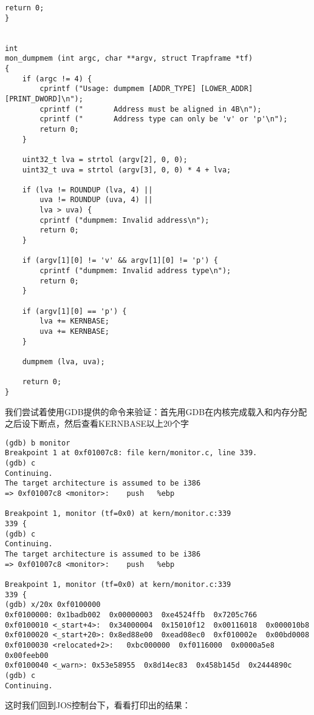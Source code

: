 \documentclass{article}
\begin{document}
\begin{CJK*}{UTF8}{gkai}
\begin{enumerate}
{\begin{lstlisting}[style=ccode, title={\scriptsize \ttfamily \bfseries kern/pmap.c}]
    return 0;
}


int
mon_dumpmem (int argc, char **argv, struct Trapframe *tf)
{
    if (argc != 4) {
        cprintf ("Usage: dumpmem [ADDR_TYPE] [LOWER_ADDR] [PRINT_DWORD]\n");
        cprintf ("       Address must be aligned in 4B\n");
        cprintf ("       Address type can only be 'v' or 'p'\n");
        return 0;
    }

    uint32_t lva = strtol (argv[2], 0, 0);
    uint32_t uva = strtol (argv[3], 0, 0) * 4 + lva;

    if (lva != ROUNDUP (lva, 4) ||
        uva != ROUNDUP (uva, 4) ||
        lva > uva) {
        cprintf ("dumpmem: Invalid address\n");
        return 0;
    }

    if (argv[1][0] != 'v' && argv[1][0] != 'p') {
        cprintf ("dumpmem: Invalid address type\n");
        return 0;
    }

    if (argv[1][0] == 'p') {
        lva += KERNBASE;
        uva += KERNBASE;
    }

    dumpmem (lva, uva); 

    return 0;
}

\end{lstlisting}

我们尝试着使用GDB提供的命令来验证：首先用GDB在内核完成载入和内存分配之后设下断点，然后查看KERNBASE以上20个字

\begin{lstlisting}[style=console]
(gdb) b monitor
Breakpoint 1 at 0xf01007c8: file kern/monitor.c, line 339.
(gdb) c
Continuing.
The target architecture is assumed to be i386
=> 0xf01007c8 <monitor>:	push   %ebp

Breakpoint 1, monitor (tf=0x0) at kern/monitor.c:339
339	{
(gdb) c
Continuing.
The target architecture is assumed to be i386
=> 0xf01007c8 <monitor>:	push   %ebp

Breakpoint 1, monitor (tf=0x0) at kern/monitor.c:339
339	{
(gdb) x/20x 0xf0100000
0xf0100000:	0x1badb002  0x00000003  0xe4524ffb  0x7205c766
0xf0100010 <_start+4>:  0x34000004  0x15010f12  0x00116018  0x000010b8
0xf0100020 <_start+20>: 0x8ed88e00  0xead08ec0  0xf010002e  0x00bd0008
0xf0100030 <relocated+2>:   0xbc000000  0xf0116000  0x0000a5e8  0x00feeb00
0xf0100040 <_warn>:	0x53e58955  0x8d14ec83  0x458b145d  0x2444890c
(gdb) c
Continuing.
\end{lstlisting}

这时我们回到JOS控制台下，看看打印出的结果：

}
\end{enumerate}
\end{CJK*}
\end{document}
